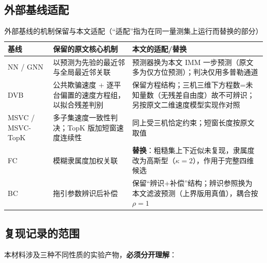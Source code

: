\documentclass[UTF8,a4paper,zihao=-4]{ctexart}
\begin{document}
\subsection{外部基线适配}\label{sup:baselines}
\begin{table}[H]
\centering
\caption{外部基线的机制保留与本文适配（“适配”指为在同一量测集上运行而替换的部分）}\label{tab:extmap}
\small
\begin{tabularx}{\textwidth}{@{}lXX@{}}
\toprule
基线 & 保留的原文核心机制 & 本文的适配/替换 \\
\midrule
NN / GNN & 以预测为先验的最近邻与全局最近邻关联 & 预测器换为本文 IMM 一步预测（原文多为仅方位预测）；判决仅用多普勒通道 \\
DVB\cite{li2024} & 公共欺骗速度 + 逐平台偏置的速度方程组，以拟合残差判别 & 保留方程结构；三机三维下方程数=未知量数（无残差自由度）故不可辨识；另按原文二维速度模型实现作对照 \\
MSVC / MSVC-TopK\cite{renVG2026} & 多子集速度一致性判决；TopK 版加短窗速度连续性 & 同上受三机恰定约束；短窗长度按原文取值 \\
FC\cite{rough2018} & 模糊隶属度加权关联 & \textbf{替换}：粗糙集上下近似未复现，隶属度改为高斯型（$\kappa=2$），作用于完整四维候选 \\
BC\cite{zhao2024,lingadevaru2022} & 拖引参数辨识后补偿 & 保留“辨识+补偿”结构；辨识参照换为本文滤波预测（上界版用真值），耦合按$\rho=1$ \\
\bottomrule
\end{tabularx}
\par{}
\end{table}

\subsection{复现记录的范围}\label{sup:repro-scope}

本材料涉及三种不同性质的实验产物，\textbf{必须分开理解}：
\end{document}
